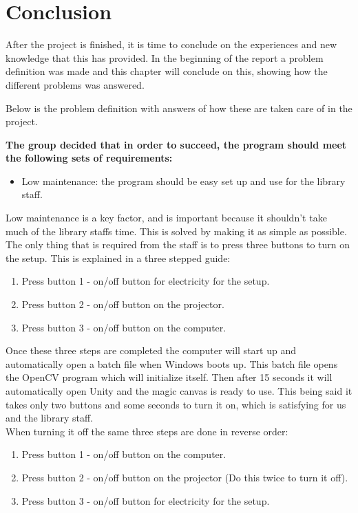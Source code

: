 \chapter{Conclusion}
After the project is finished, it is time to conclude on the experiences and new knowledge that this has provided. In the beginning of the report a problem definition was made and this chapter will conclude on this, showing how the different problems was answered.

Below is the problem definition with answers of how these are taken care of in the project.

\textbf{The group decided that in order to succeed, the program should meet the following sets of requirements:}

\begin{itemize}
\item Low maintenance: the program should be easy set up and use for the library staff.
\end{itemize}
Low maintenance is a key factor, and is important because it shouldn't take much of the library staffs time. This is solved by making it as simple as possible. The only thing that is required from the staff is to press three buttons to turn on the setup. This is explained in a three stepped guide:
\begin{enumerate}
\item Press button 1 - on/off button for electricity for the setup.
\item Press button 2 - on/off button on the projector.
\item Press button 3 - on/off button on the computer.
\end{enumerate}

Once these three steps are completed the computer will start up and automatically open a batch file when Windows boots up. This batch file opens the OpenCV program which will initialize itself. Then after 15 seconds it will automatically open Unity and the magic canvas is ready to use. This being said it takes only two buttons and some seconds to turn it on, which is satisfying for us and the library staff.\\
When turning it off the same three steps are done in reverse order:
 
\begin{enumerate}
\item Press button 1 - on/off button on the computer.
\item Press button 2 - on/off button on the projector (Do this twice to turn it off).
\item Press button 3 - on/off button for electricity for the setup.
\end{enumerate}

